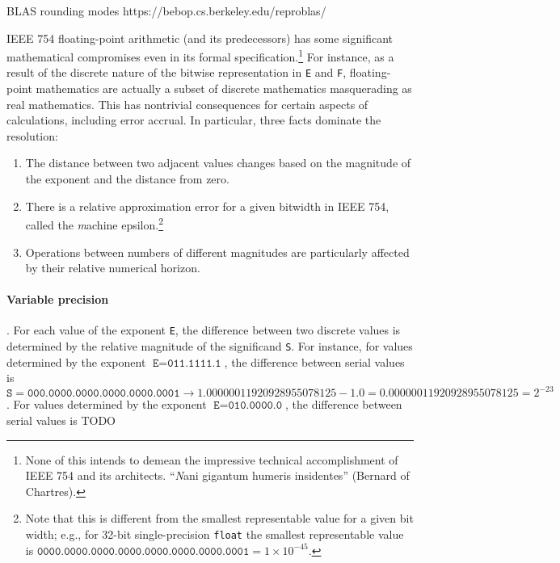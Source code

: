 \documentclass[twoside]{article}
\begin{document}
BLAS rounding modes
https://bebop.cs.berkeley.edu/reproblas/

IEEE 754 floating-point arithmetic (and its predecessors) has some significant mathematical compromises even in its formal specification.\footnote{None of this intends to demean the impressive technical accomplishment of IEEE 754 and its architects.  “{\emph Nani gigantum humeris insidentes}” (Bernard of Chartres).}  For instance, as a result of the discrete nature of the bitwise representation in \texttt{E} and \texttt{F}, floating-point mathematics are actually a subset of discrete mathematics masquerading as real mathematics.  This has nontrivial consequences for certain aspects of calculations, including error accrual.  In particular, three facts dominate the resolution:

\begin{enumerate}
  \item  The distance between two adjacent values changes based on the magnitude of the exponent and the distance from zero.
  \item  There is a relative approximation error for a given bitwidth in IEEE 754, called the {\emph machine epsilon}.\footnote{Note that this is different from the smallest representable value for a given bit width; e.g., for 32-bit single-precision \texttt{float} the smallest representable value is $\texttt{0000.0000.0000.0000.0000.0000.0000.0001} = 1\times 10^{-45}$.}
  \item  Operations between numbers of different magnitudes are particularly affected by their relative numerical horizon.
\end{enumerate}

\paragraph{Variable precision}.
For each value of the exponent \texttt{E}, the difference between two discrete values is determined by the relative magnitude of the significand \texttt{S}.  For instance, for values determined by the exponent $\texttt{E} = \texttt{011.1111.1}$, the difference between serial values is $\texttt{S} = \texttt{000.0000.0000.0000.0000.0001} \rightarrow 1.00000011920928955078125 - 1.0 = 0.00000011920928955078125 = 2^{-23}$.  For values determined by the exponent $\texttt{E} = \texttt{010.0000.0}$, the difference between serial values is TODO

\end{document}
